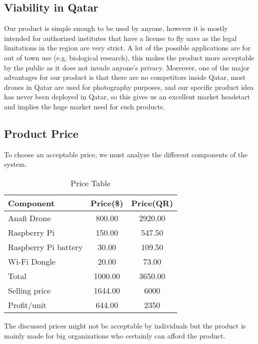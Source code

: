 \documentclass[../main.tex]{subfiles}
\begin{document}
\subsection{Viability in Qatar}
	Our product is simple enough to be used by anyone, however it is mostly intended for 
	authorized institutes that have a license to fly \glspl{uav} as the legal limitations 
	in the region are very strict. 
	A lot of the possible applications are for out of town use (e.g. biological research), 
	this makes the product more acceptable by the public as it does not invade anyone's privacy.
	Moreover, one of the major advantages for our product is that there are no competitors 
	inside Qatar, most drones in Qatar are used for photography purposes, and our
	specific product idea has never been deployed in Qatar, so this gives us an excellent 
	market headstart and implies the huge market need for such products.
\subsection{Product Price}
	To choose an acceptable price, we must analyze the different components of the system.
	\\
	\begin{table}[h!]
		\begin{center}
			\caption{Price Table}
			\label{tab: components prices}
			\begin{tabular}{p{3.5cm}|c|c} 
				\textbf{Component} & \textbf{Price(\$)} & \textbf{Price(QR)}\\
				\hline
				Anafi Drone & 800.00 & 2920.00 \\
				Raspberry Pi & 150.00 & 547.50 \\
				Raspberry Pi battery & 30.00 & 109.50\\
				Wi-Fi Dongle & 20.00 & 73.00\\
				\hline 
				Total & 1000.00 & 3650.00 \\
				Selling price & 1644.00 & 6000 \\ 
				Profit/unit & 644.00 & 2350 \\
				\hline
			\end{tabular}
		\end{center}
	\end{table}

	The discussed prices might not be acceptable by individuals but the product is mainly made for big organizations who certainly can afford the product.
	
\end{document}
